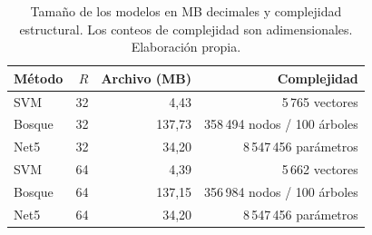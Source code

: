 \begin{table}[htbp]\centering\small
\caption{Tamaño de los modelos en MB decimales y complejidad estructural. Los conteos de complejidad son adimensionales. Elaboración propia.}\label{tab:modelos-finales}
\setlength{\tabcolsep}{4pt}
\begin{tabular}{@{}lrrr@{}}\toprule
Método & $R$ & Archivo (MB) & Complejidad \\\midrule
SVM & 32 & 4,43 & 5\,765 vectores \\
Bosque & 32 & 137,73 & 358\,494 nodos / 100 árboles \\
Net5 & 32 & 34,20 & 8\,547\,456 parámetros \\
SVM & 64 & 4,39 & 5\,662 vectores \\
Bosque & 64 & 137,15 & 356\,984 nodos / 100 árboles \\
Net5 & 64 & 34,20 & 8\,547\,456 parámetros \\
\bottomrule\end{tabular}\end{table}
